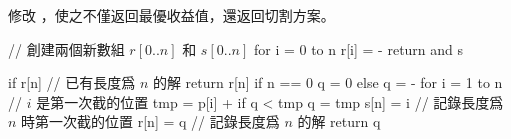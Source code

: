 \startEXERCISE
修改 ，使之不僅返回最優收益值，還返回切割方案。
\stopEXERCISE

\startANSWER
{}
\startCLRSCODE
// 創建兩個新數組 $r[0..n]$ 和 $s[0..n]$
for i = 0 to n
	r[i] = -\infty
return  and s
\stopCLRSCODE

\startCLRSCODE
if r[n] 	// 已有長度爲 $n$ 的解
	return r[n]
if n == 0
	q = 0
else
	q = -\infty
	for i = 1 to n	// $i$ 是第一次截的位置
		tmp = p[i] + 
		if q < tmp
			q = tmp
			s[n] = i	// 記錄長度爲 $n$ 時第一次截的位置
r[n] = q	// 記錄長度爲 $n$ 的解
return q
\stopCLRSCODE
\stopANSWER
